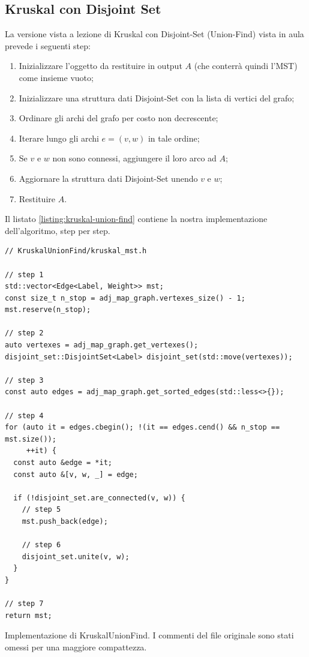 \subsection{Kruskal con Disjoint Set}

La versione vista a lezione di Kruskal con Disjoint-Set (Union-Find) vista in aula prevede i seguenti step:

\begin{enumerate}
    \item Inizializzare l'oggetto da restituire in output $A$ (che conterrà quindi l'MST) come insieme vuoto;
    \item Inizializzare una struttura dati Disjoint-Set con la lista di vertici del grafo;
    \item Ordinare gli archi del grafo per costo non decrescente;
    \item Iterare lungo gli archi $e = (v, w)$ in tale ordine;
    \item Se $v$ e $w$ non sono connessi, aggiungere il loro arco ad $A$;
    \item Aggiornare la struttura dati Disjoint-Set unendo $v$ e $w$;
    \item Restituire $A$.
\end{enumerate}

\noindent Il listato \ref{listing:kruskal-union-find} contiene la nostra implementazione dell'algoritmo, step per step.

\begin{listing}[!ht]
\begin{verbatim}
// KruskalUnionFind/kruskal_mst.h

// step 1
std::vector<Edge<Label, Weight>> mst;
const size_t n_stop = adj_map_graph.vertexes_size() - 1;
mst.reserve(n_stop);

// step 2
auto vertexes = adj_map_graph.get_vertexes();
disjoint_set::DisjointSet<Label> disjoint_set(std::move(vertexes));

// step 3
const auto edges = adj_map_graph.get_sorted_edges(std::less<>{});

// step 4
for (auto it = edges.cbegin(); !(it == edges.cend() && n_stop == mst.size());
     ++it) {
  const auto &edge = *it;
  const auto &[v, w, _] = edge;

  if (!disjoint_set.are_connected(v, w)) {
    // step 5
    mst.push_back(edge);

    // step 6
    disjoint_set.unite(v, w);
  }
}

// step 7
return mst;
\end{verbatim}
\caption{Implementazione di KruskalUnionFind. I commenti del file originale sono stati omessi per una maggiore compattezza.}
\label{listing:kruskal-union-find}
\end{listing}

